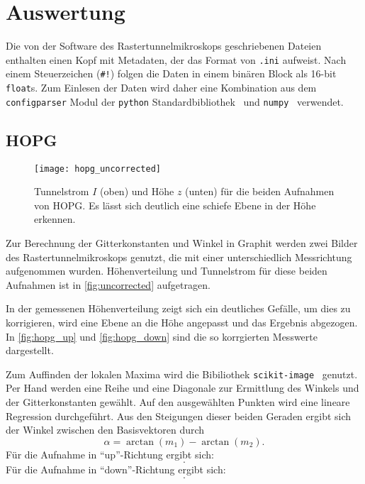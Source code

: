 \section{Auswertung}
\label{sec:Auswertung}

Die von der Software des Rastertunnelmikroskops geschriebenen Dateien enthalten einen Kopf mit Metadaten, der das Format von \texttt{.ini} aufweist.
Nach einem Steuerzeichen (\texttt{\#!}) folgen die Daten in einem binären Block als 16-bit \texttt{float}s.
Zum Einlesen der Daten wird daher eine Kombination aus dem \texttt{configparser} Modul der \texttt{python} Standardbibliothek~\cite{configparser} und \texttt{numpy}~\cite{numpy} verwendet.~\cite{readnid}

\subsection{HOPG}
\begin{figure}
  \centering
  \texttt{[image: hopg\_uncorrected]}
  \caption{%
    Tunnelstrom $I$ (oben) und Höhe $z$ (unten) für die beiden Aufnahmen von HOPG.
    Es lässt sich deutlich eine schiefe Ebene in der Höhe erkennen.%
  }\label{fig:uncorrected}
\end{figure}

Zur Berechnung der Gitterkonstanten und Winkel in Graphit werden zwei Bilder des Rastertunnelmikroskops genutzt, die mit einer unterschiedlich Messrichtung aufgenommen wurden.
Höhenverteilung und Tunnelstrom für diese beiden Aufnahmen ist in \autoref{fig:uncorrected} aufgetragen.

In der gemessenen Höhenverteilung zeigt sich ein deutliches Gefälle, um dies zu korrigieren, wird eine Ebene an die Höhe angepasst und das Ergebnis abgezogen.
In \autoref{fig:hopg_up} und \autoref{fig:hopg_down} sind die so korrgierten Messwerte dargestellt.

Zum Auffinden der lokalen Maxima wird die Bibiliothek \texttt{scikit-image}~\cite{skimage} genutzt.
Per Hand werden eine Reihe und eine Diagonale zur Ermittlung des Winkels und der Gitterkonstanten gewählt.
Auf den ausgewählten Punkten wird eine lineare Regression durchgeführt.
Aus den Steigungen dieser beiden Geraden ergibt sich der Winkel zwischen den Basisvektoren durch
\begin{equation}
  α = \arctan(m_1) -\arctan(m_2).
\end{equation}
Für die Aufnahme in \enquote{up}-Richtung ergibt sich:
\begin{equation}
  .
\end{equation}
Für die Aufnahme in \enquote{down}-Richtung ergibt sich:
\begin{equation}
  .
\end{equation}

